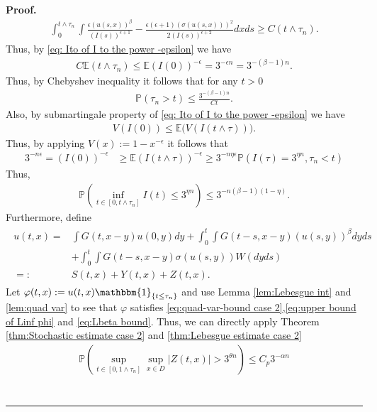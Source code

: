 \documentclass[12pt]{article}
\newenvironment{proof}[1][Proof]{\noindent\textbf{#1.} }{\ \rule{0.5em}{0.5em}}
\numberwithin{equation}{section}
\begin{document}
\begin{proof}
\begin{align}
    \int_0^{t\land \tau_n}\int \frac{\epsilon (u(s,x))^{\beta}}{(I(s))^{\epsilon+1}}-\frac{\epsilon(\epsilon+1)(\sigma(u(s,x)))^2}{2(I(s))^{\epsilon+2}}dxds\geq C(t\land\tau_n).
\end{align}
Thus, by \eqref{eq: Ito of I to the power -epsilon} we have
\begin{align}
    C\mathbb{E}(t\land \tau_n)\leq \mathbb{E}(I(0))^{-\epsilon}=3^{-\epsilon n}=3^{-(\beta-1)n}.
\end{align}
Thus, by Chebyshev inequality it follows that for any $t>0$
\begin{align}
    \mathbb{P}(\tau_n>t)\leq \frac{3^{-(\beta-1)n}}{Ct}.\label{ineq: chebyshev for tau}
\end{align}
Also, by submartingale property of \eqref{eq: Ito of I to the power -epsilon} we have
\begin{align}
    V(I(0))\leq \mathbb{E}\Big(V(I(t\wedge\tau))\Big).
\end{align}
Thus, by applying $V(x):=1-x^{-\epsilon}$ it follows that
\begin{align}
      3^{-n\epsilon}=(I(0))^{-\epsilon}&\geq \mathbb{E}(I(t\land \tau))^{-\epsilon}\geq 3^{-n\eta\epsilon}\mathbb{P}(I(\tau)=3^{\eta n},\tau_n<t)
\end{align}
Thus,
\begin{align}
    \mathbb{P}(\inf_{t\in [0,t\land\tau_n]}I(t)\leq 3^{\eta n})\leq 3^{-n(\beta-1)(1-\eta)}.\label{ineq: down probability case 2}
\end{align}
Furthermore, define
\begin{align}
    \begin{split}
         u(t,x)=&\int G(t,x-y)u(0,y)dy+\int_0^t\int G(t-s,x-y)(u(s,y))^{\beta}dyds\\
    &+\int_0^t\int G(t-s,x-y)\sigma(u(s,y))W(dyds)\\
    =:&S(t,x)+Y(t,x)+Z(t,x).
    \end{split}
\end{align}
Let $\varphi(t,x):=u(t,x)\mathbbm{1}_{\{t\leq \tau_n\}}$ and use Lemma \ref{lem:Lebesgue int} and \ref{lem:quad var} to see that $\varphi$ satisfies \eqref{eq:quad-var-bound case 2},\eqref{eq:upper bound of Linf phi} and \eqref{eq:Lbeta bound}. Thus, we can directly apply Theorem \ref{thm:Stochastic estimate case 2} and \ref{thm:Lebesgue estimate case 2}
\begin{align}
    \mathbb{P}(\sup_{t\in [0,1\land \tau_n]}\sup_{x\in D}|Z(t,x)|>3^{\theta n})\leq C_p 3^{-\alpha n}\nonumber\\

\end{align}
\end{proof}
\end{document}
